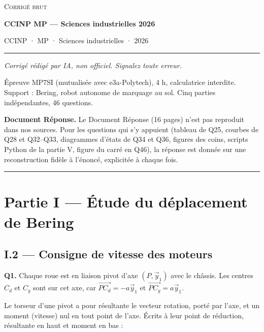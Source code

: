 \documentclass[11pt,a4paper]{article}
\begin{document}
\thispagestyle{plain}
\begin{center}
  {\small\scshape Corrigé brut}\par\smallskip
  {\LARGE\bfseries CCINP MP — Sciences industrielles 2026\par}\medskip
  {\large CCINP · MP · Sciences industrielles · 2026\par}
\end{center}
\vspace{2pt}\hrule\vspace{8pt}

\emph{Corrigé rédigé par IA, non officiel. Signalez toute erreur.}

Épreuve MP7SI (mutualisée avec e3a-Polytech), 4 h, calculatrice interdite. Support : Bering, robot autonome de marquage au sol. Cinq parties indépendantes, 46 questions.

\textbf{Document Réponse.} Le Document Réponse (16 pages) n'est pas reproduit dans nos sources. Pour les questions qui s'y appuient (tableau de Q25, courbes de Q28 et Q32--Q33, diagrammes d'états de Q34 et Q36, figures des coins, scripts Python de la partie V, figure du carré en Q46), la réponse est donnée sur une reconstruction fidèle à l'énoncé, explicitée à chaque fois.

\begin{center}\rule{0.5\linewidth}{0.5pt}\end{center}

\hypertarget{partie-i-uxe9tude-du-duxe9placement-de-bering}{%
\section{Partie I --- Étude du déplacement de Bering}\label{partie-i-uxe9tude-du-duxe9placement-de-bering}}

\hypertarget{i.2-consigne-de-vitesse-des-moteurs}{%
\subsection{I.2 --- Consigne de vitesse des moteurs}\label{i.2-consigne-de-vitesse-des-moteurs}}

\textbf{Q1.} Chaque roue est en liaison pivot d'axe \((P,\vec y_1)\) avec le châssis. Les centres \(C_d\) et \(C_g\) sont sur cet axe, car \(\overrightarrow{PC_d} = -a\vec y_1\) et \(\overrightarrow{PC_g} = a\vec y_1\).

Le torseur d'une pivot a pour résultante le vecteur rotation, porté par l'axe, et un moment (vitesse) nul en tout point de l'axe. Écrits à leur point de réduction, résultante en haut et moment en bas :
\end{document}
